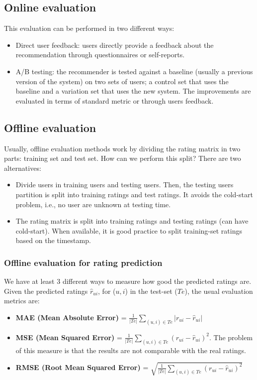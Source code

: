 \subsection{Online evaluation}
This evaluation can be performed in two different ways:
\begin{itemize}
    \item Direct user feedback: users directly provide a feedback about the recommendation through questionnaires or self-reports.
    \item A/B testing: the recommender is tested against a baseline (usually a previous version of the system) on two sets of users; a control set that uses the baseline and a variation set that uses the new system. The improvements are evaluated in terms of standard metric or through users feedback. 
\end{itemize}
\subsection{Offline evaluation}
Usually, offline evaluation methods work by dividing the rating matrix in two parts: training set and test set. How can we perform this split? There are two alternatives:
\begin{itemize}
    \item Divide users in training users and testing users. Then, the testing users partition is split into training ratings and test ratings. It avoids the cold-start problem, i.e., no user are unknown at testing time.
    \item The rating matrix is split into training ratings and testing ratings (can have cold-start). When available, it is good practice to split training-set ratings based on the timestamp.  
\end{itemize}
\subsubsection{Offline evaluation for rating prediction}
We have at least 3 different ways to measure how good the predicted ratings are.\newline\newline
Given the predicted ratings $\hat{r}_{ui}$, for ($u,i$) in the test-set ($Te$), the usual evaluation metrics are:
\begin{itemize}
    \item \textbf{MAE (Mean Absolute Error)} = $\frac{1}{|Te|}\sum_{(u,i)\in Te}|r_{ui} - \hat{r}_{ui}|$
    \item \textbf{MSE (Mean Squared Error)} = $\frac{1}{|Te|}\sum_{(u,i)\in Te}(r_{ui} - \hat{r}_{ui})^{2}$. The problem of this measure is that the results are not comparable with the real ratings.
    \item \textbf{RMSE (Root Mean Squared Error)} = $\sqrt{\frac{1}{|Te|}\sum_{(u,i)\in Te}(r_{ui} - \hat{r}_{ui})^{2}}$
\end{itemize}

